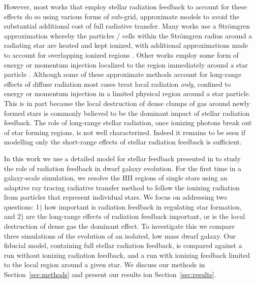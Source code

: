 \documentclass[twocolumn]{aastex62}
\begin{document}
However, most works that employ stellar radiation feedback to account for these effects do so using various forms of sub-grid, approximate models to avoid the substantial additional cost of full radiative transfer. Many works use a Str{\"o}mgren approximation whereby the particles / cells within the Str{\"o}mgren radius around a radiating star are heated and kept ionized, with additional approximations made to account for overlapping ionized regions \citep[e.g.][]{HQM2011,Hu2016,Hu2017}. Other works employ some form of energy or momentum injection localized to the region immediately around a star particle \citep[e.g.][(\textit{need more})]{Agertz2013,Roskar2014,Ceverino2014,Forbes2016}. Although some of these approximate methods account for long-range effects of diffuse radiation \citep{HQM2012,Hopkins2018} most cases treat local radiation {\it only}, confined to energy or momentum injection in a limited physical region around a star particle. This is in part because the local destruction of dense clumps of gas around newly formed stars is commonly believed to be the dominant impact of stellar radiation feedback. The role of long-range stellar radiation, once ionizing photons break out of star forming regions, is not well characterized. Indeed it remains to be seen if modelling only the short-range effects of stellar radiation feedback is sufficient.


In this work we use a detailed model for stellar feedback presented in \cite{Emerick2018} to study the role of radiation feedback in dwarf galaxy evolution. For the first time in a galaxy-scale simulation, we resolve the HII regions of single stars using an adaptive ray tracing radiative transfer method to follow the ionizing radiation from particles that represent individual stars. We focus on addressing two questions: 1) how important is radiation feedback in regulating star formation, and 2) are the long-range effects of radiation feedback important, or is the local destruction of dense gas the dominant effect. To investigate this we compare three simulations of the evolution of an isolated, low mass dwarf galaxy. Our fiducial model, containing full stellar radiation feedback, is compared against a run without ionizing radiation feedback, and a run with ionizing feedback limited to the local region around a given star. We discuss our methods in Section~\ref{sec:methods} and present our results ion Section~\ref{sec:results}.
\end{document}
